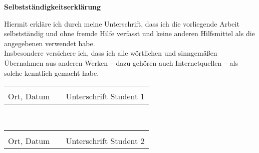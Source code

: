 \begin{centering}
\textbf{\Huge Selbstständigkeitserklärung}\\
\end{centering}
\vspace{1.5cm}
\begin{doublespacing}
Hiermit erkläre ich durch meine Unterschrift, dass ich die vorliegende Arbeit selbstständig und ohne fremde Hilfe verfasst und keine anderen Hilfsmittel als die angegebenen verwendet habe.\\

Insbesondere versichere ich, dass ich alle wörtlichen und sinngemäßen Übernahmen aus anderen Werken – dazu gehören auch Internetquellen – als solche kenntlich gemacht habe.\\
\end{doublespacing}
\vspace{2cm}

\begin{tabular}{lp{12em}l}
\hspace{4.35cm}  && \hspace{4.35cm} \\\cline{1-1}\cline{3-3}
Ort, Datum    && Unterschrift Student 1
\end{tabular}\\

\vspace{2cm}

\begin{tabular}{lp{12em}l}
\hspace{4.35cm}  && \hspace{4.35cm} \\\cline{1-1}\cline{3-3}
Ort, Datum    && Unterschrift Student 2
\end{tabular}\\

